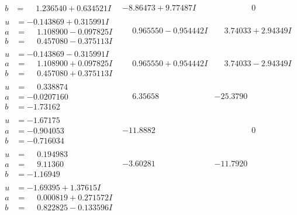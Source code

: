 \documentclass[1p]{elsarticle_modified}
\theoremstyle{definition}
\begin{document}
$$\begin{array}{c|c|c}
\begin{aligned}
b &= \phantom{-}1.236540 + 0.634521 I\end{aligned}
 & -8.86473 + 9.77487 I & \phantom{-0.000000 } 0 \\ \hline\begin{aligned}
u &= -0.143869 + 0.315991 I \\
a &= \phantom{-}1.108900 - 0.097825 I \\
b &= \phantom{-}0.457080 - 0.375113 I\end{aligned}
 & \phantom{-}0.965550 - 0.954442 I & \phantom{-}3.74033 + 2.94349 I \\ \hline\begin{aligned}
u &= -0.143869 - 0.315991 I \\
a &= \phantom{-}1.108900 + 0.097825 I \\
b &= \phantom{-}0.457080 + 0.375113 I\end{aligned}
 & \phantom{-}0.965550 + 0.954442 I & \phantom{-}3.74033 - 2.94349 I \\ \hline\begin{aligned}
u &= \phantom{-}0.338874\phantom{ +0.000000I} \\
a &= -0.0207160\phantom{ +0.000000I} \\
b &= -1.73162\phantom{ +0.000000I}\end{aligned}
 & \phantom{-}6.35658\phantom{ +0.000000I} & -25.3790\phantom{ +0.000000I} \\ \hline\begin{aligned}
u &= -1.67175\phantom{ +0.000000I} \\
a &= -0.904053\phantom{ +0.000000I} \\
b &= -0.716034\phantom{ +0.000000I}\end{aligned}
 & -11.8882\phantom{ +0.000000I} & \phantom{-0.000000 } 0 \\ \hline\begin{aligned}
u &= \phantom{-}0.194983\phantom{ +0.000000I} \\
a &= \phantom{-}9.11360\phantom{ +0.000000I} \\
b &= -1.16949\phantom{ +0.000000I}\end{aligned}
 & -3.60281\phantom{ +0.000000I} & -11.7920\phantom{ +0.000000I} \\ \hline\begin{aligned}
u &= -1.69395 + 1.37615 I \\
a &= \phantom{-}0.000819 + 0.271572 I \\
b &= \phantom{-}0.822825 - 0.133596 I\end{aligned}

\end{array}$$
\end{document}
